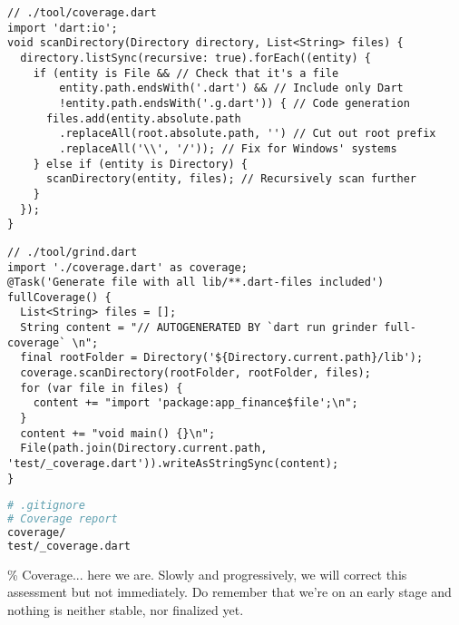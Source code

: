 \begin{lstlisting}
// ./tool/coverage.dart
import 'dart:io';
void scanDirectory(Directory directory, List<String> files) {
  directory.listSync(recursive: true).forEach((entity) {
    if (entity is File && // Check that it's a file
        entity.path.endsWith('.dart') && // Include only Dart
        !entity.path.endsWith('.g.dart')) { // Code generation
      files.add(entity.absolute.path
        .replaceAll(root.absolute.path, '') // Cut out root prefix
        .replaceAll('\\', '/')); // Fix for Windows' systems
    } else if (entity is Directory) {
      scanDirectory(entity, files); // Recursively scan further
    }
  });
}
\end{lstlisting}

\begin{lstlisting}
// ./tool/grind.dart
import './coverage.dart' as coverage;
@Task('Generate file with all lib/**.dart-files included')
fullCoverage() {
  List<String> files = [];
  String content = "// AUTOGENERATED BY `dart run grinder full-coverage` \n";
  final rootFolder = Directory('${Directory.current.path}/lib');
  coverage.scanDirectory(rootFolder, rootFolder, files);
  for (var file in files) {
    content += "import 'package:app_finance$file';\n";
  }
  content += "void main() {}\n";
  File(path.join(Directory.current.path, 'test/_coverage.dart')).writeAsStringSync(content);
}
\end{lstlisting}

\begin{lstlisting}[language=bash]
# .gitignore
# Coverage report
coverage/
test/_coverage.dart
\end{lstlisting}

\% Coverage... here we are. Slowly and progressively, we will correct this assessment but not immediately.
Do remember that we're on an early stage and nothing is neither stable, nor finalized yet.